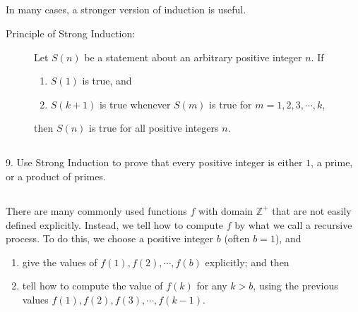 \documentclass{article}
\newcommand{\0}{\mathbf 0}
\newcommand{\1}{\mathbf 1}
\newcommand\BZ{\mathbb Z^+}
\begin{document}
\subsection*{ }

In many cases, a stronger version of induction is useful.

\begin{description}
  \item[Principle of Strong Induction:] Let $S(n)$ be a statement about an arbitrary positive integer $n$. If
    \begin{enumerate}[\hspace{1cm}(1.)]
      \item $S(1)$ is true, and
      \item $S(k+1)$ is true whenever $S(m)$ is true for $m = 1,2,3,\cdots,k$,
    \end{enumerate}
    then $S(n)$ is true for all positive integers $n$.
\end{description}

\subsection*{ }

\begin{description}
  \item{9.} Use Strong Induction to prove that every positive integer is either $1$, a prime, or a product of primes.
\end{description}

\subsection*{ }

There are many commonly used functions $f$ with domain $\BZ$ that are not easily defined explicitly. Instead, we tell how to compute $f$ by what we call a recursive process. To do this, we choose a positive integer $b$ (often $b = 1$), and
\begin{enumerate}[\hspace{1cm}(1.)]
  \item give the values of $f(1), f(2), \cdots, f(b)$ explicitly; and then
  \item tell how to compute the value of $f(k)$ for any $k > b$, using the previous values $f(1), f(2), f(3), \cdots, f(k-1)$.
\end{enumerate}

\subsection*{ }
\end{document}
